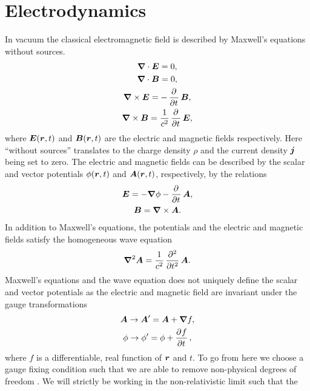     \section{Electrodynamics}
        In vacuum the classical electromagnetic field is described by Maxwell's
        equations without sources.
        \begin{gather}
            \vfg{\nabla}\cdot\vfg{E} = 0, \\
            \vfg{\nabla}\cdot\vfg{B} = 0, \\
            \vfg{\nabla}\times\vfg{E} = -\dpd{}{t}\vfg{B}, \\
            \vfg{\nabla}\times\vfg{B} = \frac{1}{c^2}\dpd{}{t}\vfg{E},
        \end{gather}
        where $\boldsymbol{E}(\boldsymbol{r}, t)$ and $\boldsymbol{B}(\boldsymbol{r}, t)$ are the
        electric and magnetic fields respectively.
        Here ``without sources'' translates to the charge density $\rho$ and the
        current density $\boldsymbol{j}$ being set to zero.
        The electric and magnetic fields can be described by the scalar and
        vector potentials $\phi(\boldsymbol{r}, t)$ and $\boldsymbol{A}(\boldsymbol{r}, t)$,
        respectively, by the relations
        \begin{gather}
            \vfg{E} = -\vfg{\nabla}\phi - \dpd{}{t}\vfg{A}, \\
            \vfg{B} = \vfg{\nabla}\times\vfg{A}.
        \end{gather}
        In addition to Maxwell's equations, the potentials and the electric and
        magnetic fields satisfy the homogeneous wave equation
        \cite{joachain2012atoms}
        \begin{align}
            \vfg{\nabla}^2\vfg{A} = \frac{1}{c^2}\dpd[2]{}{t}\vfg{A}.
            \label{eq:wave-equation}
        \end{align}
        Maxwell's equations and the wave equation does not uniquely define the
        scalar and vector potentials as the electric and magnetic field are
        invariant under the gauge transformations
        \begin{gather}
            \vfg{A} \to \vfg{A}' = \vfg{A} + \vfg{\nabla} f, \\
            \phi \to \phi' = \phi + \dpd{f}{t},
        \end{gather}
        where $f$ is a differentiable, real function of $\boldsymbol{r}$ and $t$.
        To go from here we choose a gauge fixing condition such that we are able
        to remove non-physical degrees of freedom \cite{modern-qm}.
        We will strictly be working in the non-relativistic limit such that the
